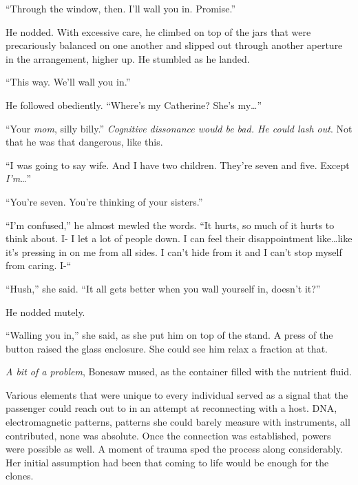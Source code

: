 ``Through the window, then.  I'll wall you in.  Promise.''



He nodded.  With excessive care, he climbed on top of the jars that were precariously balanced on one another and slipped out through another aperture in the arrangement, higher up.  He stumbled as he landed.



``This way.  We'll wall you in.''



He followed obediently.  ``Where's my Catherine?  She's my\ldots''



``Your \emph{mom}, silly billy.''  \emph{Cognitive dissonance would be bad.  He could lash out}.  Not that he was that dangerous, like this.



``I was going to say wife.  And I have two children.  They're seven and five.  Except \emph{I'm}\ldots''



``You're seven.  You're thinking of your sisters.''



``I'm confused,'' he almost mewled the words.  ``It hurts, so much of it hurts to think about.  I- I let a lot of people down.  I can feel their disappointment like\ldots like it's pressing in on me from all sides.  I can't hide from it and I can't stop myself from caring.  I-``



``Hush,'' she said.  ``It all gets better when you wall yourself in, doesn't it?''



He nodded mutely.



``Walling you in,'' she said, as she put him on top of the stand.  A press of the button raised the glass enclosure.  She could see him relax a fraction at that.



\emph{A bit of a problem}, Bonesaw mused, as the container filled with the nutrient fluid.



Various elements that were unique to every individual served as a signal that the passenger could reach out to in an attempt at reconnecting with a host.  DNA, electromagnetic patterns, patterns she could barely measure with instruments, all contributed, none was absolute.  Once the connection was established, powers were possible as well.  A moment of trauma sped the process along considerably.  Her initial assumption had been that coming to life would be enough for the clones.



